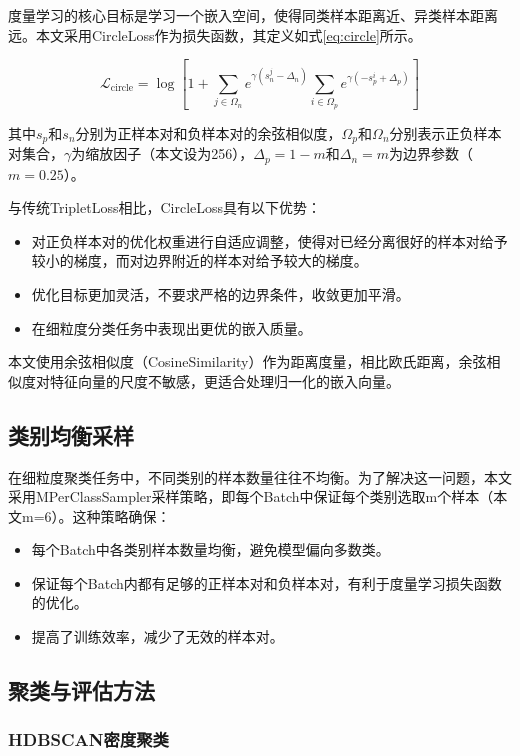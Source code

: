 \documentclass[a4paper]{article}
\begin{document}
度量学习的核心目标是学习一个嵌入空间，使得同类样本距离近、异类样本距离远。本文采用CircleLoss作为损失函数，其定义如式\ref{eq:circle}所示。

\begin{equation}
\label{eq:circle}
\mathcal{L}_{\text{circle}} = \log\left[1 + \sum_{j\in\Omega_n} e^{\gamma(s^j_n - \Delta_n)} \sum_{i\in\Omega_p} e^{\gamma(-s^i_p + \Delta_p)}\right]
\end{equation}

其中$s_p$和$s_n$分别为正样本对和负样本对的余弦相似度，$\Omega_p$和$\Omega_n$分别表示正负样本对集合，$\gamma$为缩放因子（本文设为256），$\Delta_p=1-m$和$\Delta_n=m$为边界参数（$m=0.25$）。

与传统TripletLoss相比，CircleLoss具有以下优势：
\begin{itemize}
    \item 对正负样本对的优化权重进行自适应调整，使得对已经分离很好的样本对给予较小的梯度，而对边界附近的样本对给予较大的梯度。
    \item 优化目标更加灵活，不要求严格的边界条件，收敛更加平滑。
    \item 在细粒度分类任务中表现出更优的嵌入质量。
\end{itemize}

本文使用余弦相似度（CosineSimilarity）作为距离度量，相比欧氏距离，余弦相似度对特征向量的尺度不敏感，更适合处理归一化的嵌入向量。

\subsection{类别均衡采样}

在细粒度聚类任务中，不同类别的样本数量往往不均衡。为了解决这一问题，本文采用MPerClassSampler采样策略，即每个Batch中保证每个类别选取m个样本（本文m=6）。这种策略确保：

\begin{itemize}
    \item 每个Batch中各类别样本数量均衡，避免模型偏向多数类。
    \item 保证每个Batch内都有足够的正样本对和负样本对，有利于度量学习损失函数的优化。
    \item 提高了训练效率，减少了无效的样本对。
\end{itemize}

\subsection{聚类与评估方法}

\subsubsection{HDBSCAN密度聚类}
\end{document}
